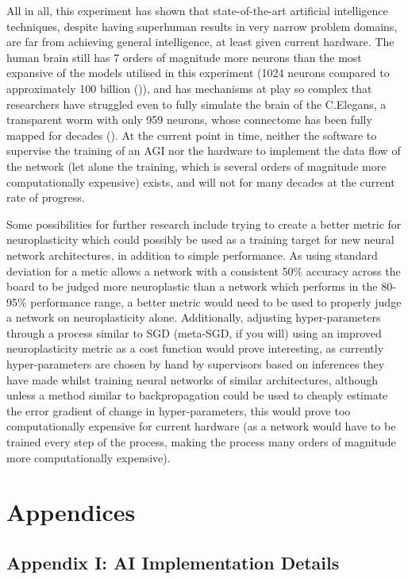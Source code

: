 \documentclass[]{report}
\begin{document}
All in all, this experiment has shown that state-of-the-art artificial intelligence techniques, despite having superhuman results in very narrow problem domains, are far from achieving general intelligence, at least given current hardware. The human brain still has 7 orders of magnitude more neurons than the most expansive of the models utilised in this experiment (1024 neurons compared to approximately 100 billion (\cite{herculano2009human})), and has mechanisms at play so complex that researchers have struggled even to fully simulate the brain of the C.Elegans, a transparent worm with only 959 neurons, whose connectome has been fully mapped for decades (\cite{wormwiring2012}). At the current point in time, neither the software to supervise the training of an AGI nor the hardware to implement the data flow of the network (let alone the training, which is several orders of magnitude more computationally expensive) exists, and will not for many decades at the current rate of progress.

Some possibilities for further research include trying to create a better metric for neuroplasticity which could possibly be used as a training target for new neural network architectures, in addition to simple performance. As using standard deviation for a metic allows a network with a consistent 50\% accuracy across the board to be judged more neuroplastic than a network which performs in the 80-95\% performance range, a better metric would need to be used to properly judge a network on neuroplasticity alone. Additionally, adjusting hyper-parameters through a process similar to SGD (meta-SGD, if you will) using an improved neuroplasticity metric as a cost function would prove interesting, as currently hyper-parameters are chosen by hand by supervisors based on inferences they have made whilst training neural networks of similar architectures, although unless a method similar to backpropagation could be used to cheaply estimate the error gradient of change in hyper-parameters, this would prove too computationally expensive for current hardware (as a network would have to be trained every step of the process, making the process many orders of magnitude more computationally expensive).

\section{Appendices}

\label{sec:Appendix_I}
\subsection{Appendix I: AI Implementation Details}
\end{document}
